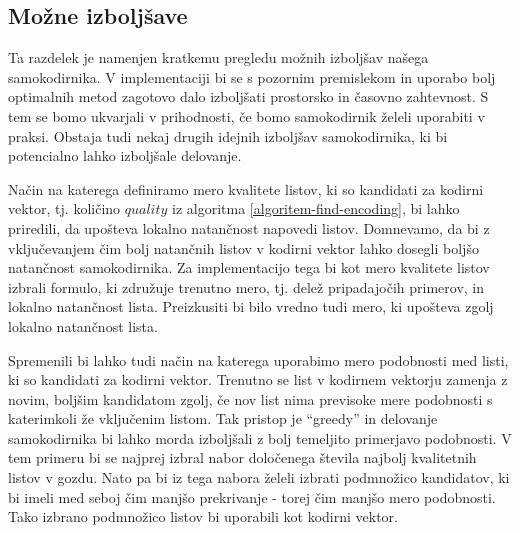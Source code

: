\documentclass[12pt,a4paper]{article}
\begin{document}


\subsection{Možne izboljšave}


Ta razdelek je namenjen kratkemu pregledu možnih izboljšav našega samokodirnika.
V implementaciji bi se s pozornim premislekom in uporabo bolj optimalnih metod zagotovo dalo izboljšati prostorsko in časovno zahtevnost.
S tem se bomo ukvarjali v prihodnosti, če bomo samokodirnik želeli uporabiti v praksi.
Obstaja tudi nekaj drugih idejnih izboljšav samokodirnika, ki bi potencialno lahko izboljšale delovanje.

Način na katerega definiramo mero kvalitete listov, ki so kandidati za kodirni vektor, tj. količino $quality$ iz algoritma \ref{algoritem-find-encoding},
bi lahko priredili, da upošteva lokalno natančnost napovedi listov.
Domnevamo, da bi z vključevanjem čim bolj natančnih listov v kodirni vektor lahko dosegli boljšo natančnost samokodirnika.
Za implementacijo tega bi kot mero kvalitete listov izbrali formulo, ki združuje trenutno mero, tj. delež pripadajočih primerov, in lokalno natančnost lista.
Preizkusiti bi bilo vredno tudi mero, ki upošteva zgolj lokalno natančnost lista.

Spremenili bi lahko tudi način na katerega uporabimo mero podobnosti med listi, ki so kandidati za kodirni vektor.
Trenutno se list v kodirnem vektorju zamenja z novim, boljšim kandidatom zgolj, če nov list nima previsoke mere podobnosti s katerimkoli že vključenim listom.
Tak pristop je ``greedy'' in delovanje samokodirnika bi lahko morda izboljšali z bolj temeljito primerjavo podobnosti.
V tem primeru bi se najprej izbral nabor določenega števila najbolj kvalitetnih listov v gozdu.
Nato pa bi iz tega nabora želeli izbrati podmnožico kandidatov, ki bi imeli med seboj čim manjšo prekrivanje - torej čim manjšo mero podobnosti.
Tako izbrano podmnožico listov bi uporabili kot kodirni vektor.
\end{document}

